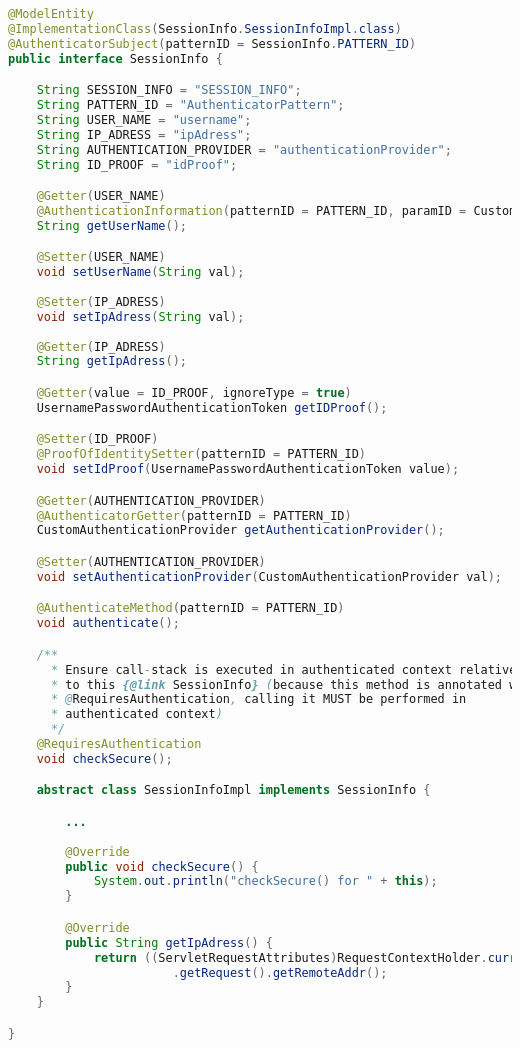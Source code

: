 \begin{lstlisting}[language=Java,basicstyle=\ttfamily\footnotesize, caption=Mise en oeuvre de l'entité \textit{Subject} : \texttt{SessionInfo.java},label=listing:SessionInfo]
@ModelEntity
@ImplementationClass(SessionInfo.SessionInfoImpl.class)
@AuthenticatorSubject(patternID = SessionInfo.PATTERN_ID)
public interface SessionInfo {

	String SESSION_INFO = "SESSION_INFO";
	String PATTERN_ID = "AuthenticatorPattern";
	String USER_NAME = "username";
	String IP_ADRESS = "ipAdress";
	String AUTHENTICATION_PROVIDER = "authenticationProvider";
	String ID_PROOF = "idProof";

	@Getter(USER_NAME)
	@AuthenticationInformation(patternID = PATTERN_ID, paramID = CustomAuthenticationProvider.USER_NAME)
	String getUserName();

	@Setter(USER_NAME)
	void setUserName(String val);
	
	@Setter(IP_ADRESS)
	void setIpAdress(String val);
	
	@Getter(IP_ADRESS)
	String getIpAdress();

	@Getter(value = ID_PROOF, ignoreType = true)
    UsernamePasswordAuthenticationToken getIDProof();

	@Setter(ID_PROOF)
	@ProofOfIdentitySetter(patternID = PATTERN_ID)
	void setIdProof(UsernamePasswordAuthenticationToken value);

	@Getter(AUTHENTICATION_PROVIDER)
	@AuthenticatorGetter(patternID = PATTERN_ID)
	CustomAuthenticationProvider getAuthenticationProvider();

	@Setter(AUTHENTICATION_PROVIDER)
	void setAuthenticationProvider(CustomAuthenticationProvider val);

	@AuthenticateMethod(patternID = PATTERN_ID)
	void authenticate();

    /**
      * Ensure call-stack is executed in authenticated context relatively 
      * to this {@link SessionInfo} (because this method is annotated with 
      * @RequiresAuthentication, calling it MUST be performed in
      * authenticated context)
      */
	@RequiresAuthentication
	void checkSecure();

	abstract class SessionInfoImpl implements SessionInfo {

        ...
        
		@Override
		public void checkSecure() {
			System.out.println("checkSecure() for " + this);
		}

		@Override
		public String getIpAdress() {
			return ((ServletRequestAttributes)RequestContextHolder.currentRequestAttributes())
			           .getRequest().getRemoteAddr();
		}
	}

}
\end{lstlisting}

